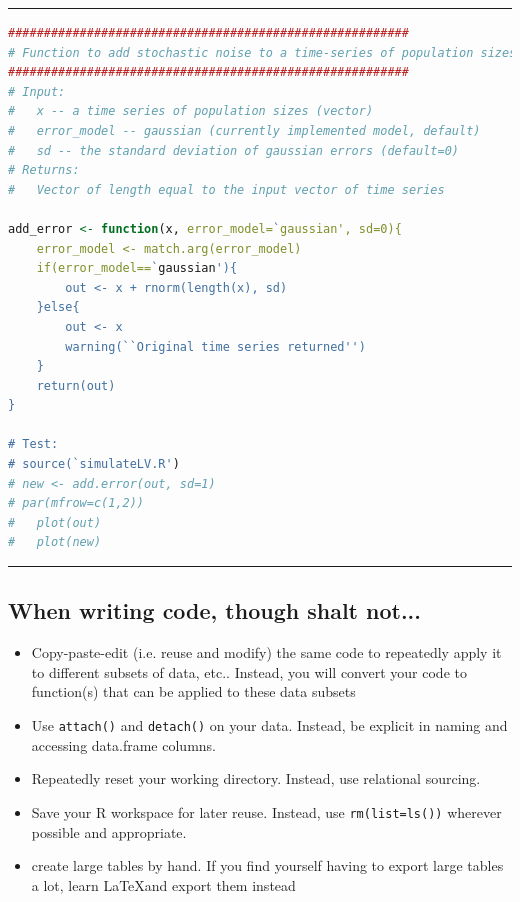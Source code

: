 \documentclass[12pt,letterpaper]{article}
\begin{document}
\noindent\rule{12cm}{0.4pt}
\begin{lstlisting}[language=R]
########################################################
# Function to add stochastic noise to a time-series of population sizes.
########################################################
# Input:
#	x -- a time series of population sizes (vector)
#	error_model -- gaussian (currently implemented model, default)
# 	sd -- the standard deviation of gaussian errors (default=0)
# Returns:
#	Vector of length equal to the input vector of time series

add_error <- function(x, error_model=`gaussian', sd=0){
	error_model <- match.arg(error_model)
	if(error_model==`gaussian'){
		out <- x + rnorm(length(x), sd)
	}else{
		out <- x
		warning(``Original time series returned'')
	}
	return(out)
}

# Test:
# source(`simulateLV.R')
# new <- add.error(out, sd=1)
# par(mfrow=c(1,2))
#	plot(out)
#	plot(new)
\end{lstlisting}
\noindent\rule{12cm}{0.4pt}


\subsection{When writing code, though shalt not...}

\begin{itemize}
\item Copy-paste-edit (i.e. reuse and modify) the same code to repeatedly apply it to different subsets of data, etc..  Instead, you will convert your code to function(s) that can be applied to these data subsets
\item Use \texttt{attach()} and \texttt{detach()} on your data.  Instead, be explicit in naming and accessing data.frame columns.
\item Repeatedly reset your working directory.  Instead, use relational sourcing.
\item Save your \textsf{R} workspace for later reuse.  Instead, use \texttt{rm(list=ls())} wherever possible and appropriate.
\item create large tables by hand. If you find yourself having to export large tables a lot, learn \LaTeX and export them instead
\end{itemize}



\end{document}

